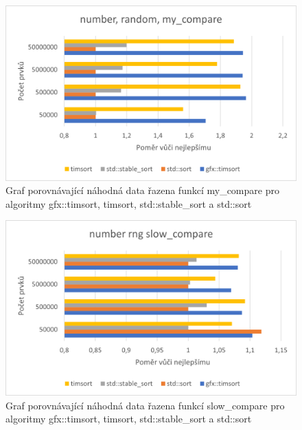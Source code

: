 \documentclass[thesis=B,czech]{FITthesis}[2019/12/23]
\begin{document}
\begin{figure}[htbp]\centering
	\includegraphics{obrazky/graf11.png}
	\caption[Graf porovnávající náhodná data řazena funkcí my\_compare pro algoritmy gfx::timsort, timsort, std::stable\_sort a std::sort]{Graf porovnávající náhodná data řazena funkcí my\_compare pro algoritmy gfx::timsort, timsort, std::stable\_sort a std::sort}\label{fig:graf11}
\end{figure}

\begin{figure}[htbp]\centering
	\includegraphics{obrazky/graf12.png}
	\caption[Graf porovnávající náhodná data řazena funkcí slow\_compare pro algoritmy gfx::timsort, timsort, std::stable\_sort a std::sort]{Graf porovnávající náhodná data řazena funkcí slow\_compare pro algoritmy gfx::timsort, timsort, std::stable\_sort a std::sort}\label{fig:graf12}
\end{figure}
\end{document}
